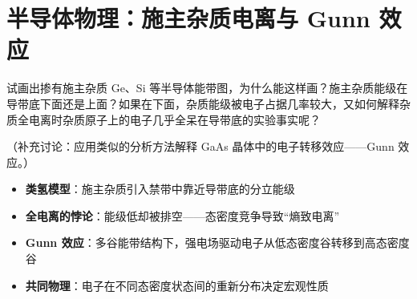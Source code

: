 \section{半导体物理：施主杂质电离与 Gunn 效应}
\label{sec:donor-ionization-gunn}

\begin{modelbox}[题目：施主杂质能级与全电离的物理机制]
试画出掺有施主杂质 Ge、Si 等半导体能带图，为什么能这样画？施主杂质能级在导带底下面还是上面？如果在下面，杂质能级被电子占据几率较大，又如何解释杂质全电离时杂质原子上的电子几乎全呆在导带底的实验事实呢？

（补充讨论：应用类似的分析方法解释 GaAs 晶体中的电子转移效应——Gunn 效应。）
\end{modelbox}

\begin{tipbox}[考点快速分析]
\begin{itemize}
    \item \textbf{类氢模型}：施主杂质引入禁带中靠近导带底的分立能级
    \item \textbf{全电离的悖论}：能级低却被排空——态密度竞争导致``熵致电离''
    \item \textbf{Gunn 效应}：多谷能带结构下，强电场驱动电子从低态密度谷转移到高态密度谷
    \item \textbf{共同物理}：电子在不同态密度状态间的重新分布决定宏观性质
\end{itemize}
\end{tipbox}

